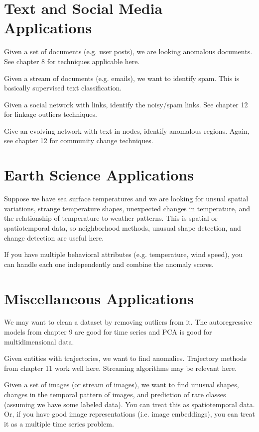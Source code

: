 \documentclass[a4paper]{article}
\begin{document}
\section{Text and Social Media Applications}
Given a set of documents (e.g. user posts), we are looking anomalous documents.
See chapter 8 for techniques applicable here.

Given a stream of documents (e.g. emails), we want to identify spam. This is
basically supervised text classification.

Given a social network with links, identify the noisy/spam links. See chapter 12
for linkage outliers techniques.

Give an evolving network with text in nodes, identify anomalous regions. Again,
see chapter 12 for community change techniques.

\section{Earth Science Applications}
Suppose we have sea surface temperatures and we are looking for unsual spatial
variations, strange temperature shapes, unexpected changes in temperature,
and the relationship of temperature to weather patterns. This is spatial or
spatiotemporal data, so neighborhood methods, unusual shape detection, and
change detection are useful here.

If you have multiple behavioral attributes (e.g. temperature, wind speed),
you can handle each one independently and combine the anomaly scores.

\section{Miscellaneous Applications}
We may want to clean a dataset by removing outliers from it. The autoregressive
models from chapter 9 are good for time series and PCA is good for
multidimensional data.

Given entities with trajectories, we want to find anomalies. Trajectory methods
from chapter 11 work well here. Streaming algorithms may be relevant here.

Given a set of images (or stream of images), we want to find unusual shapes,
changes in the temporal pattern of images, and prediction of rare classes
(assuming we have some labeled data). You can treat this as spatiotemporal data.
Or, if you have good image representations (i.e. image embeddings), you can
treat it as a multiple time series problem.
\end{document}
